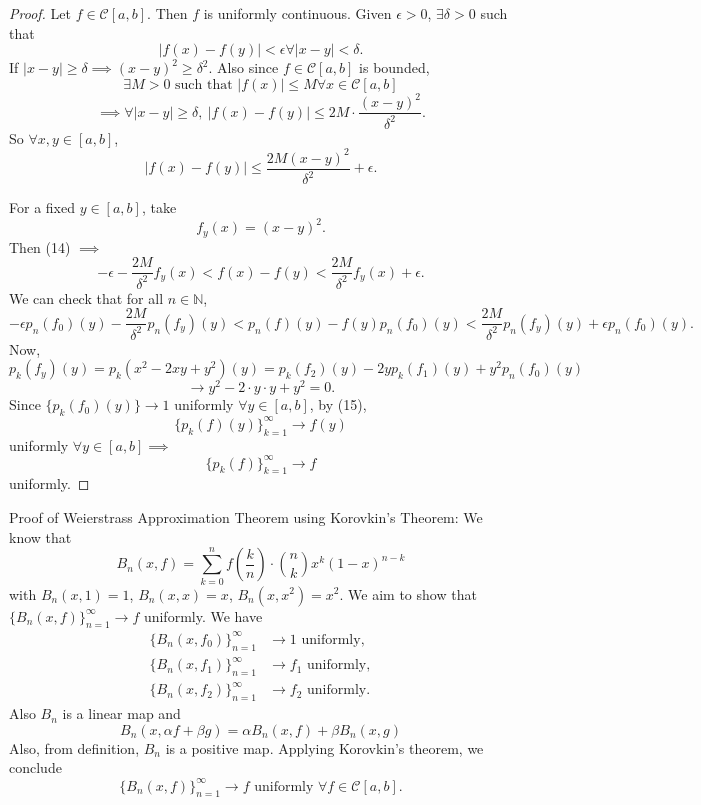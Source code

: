 \documentclass{functionspaces}
\begin{document}
\begin{proof}
Let \( f \in \mathcal{C}[a,b] \). Then \( f \) is uniformly continuous. Given \( \epsilon>0 \), \( \exists  \delta>0 \) such that
\[
|f(x)-f(y)|<\epsilon  \forall  |x-y|<\delta.
\]
If \( |x-y| \geq \delta  \implies  (x-y)^{2} \geq \delta^{2} \). Also since \( f \in \mathcal{C}[a,b] \) is bounded,
\[
\exists  M>0 \text{ such that } |f(x)| \leq M  \forall  x \in \mathcal{C}[a,b]
\]
\[
\implies  \forall  |x-y| \geq \delta,\ |f(x)-f(y)| \leq 2M \cdot \frac{(x-y)^{2}}{\delta^{2}}.
\]
So \( \forall  x,y \in [a,b] \),
\[
|f(x)-f(y)| \leq \frac{2M(x-y)^{2}}{\delta^{2}}+\epsilon. \tag{14}
\]

For a fixed \( y \in [a,b] \), take
\[
f_{y}(x)=(x-y)^{2}.
\]
Then (14) \( \implies \)
\[
-\epsilon-\frac{2M}{\delta^{2}}f_{y}(x)<f(x)-f(y)<\frac{2M}{\delta^{2}}f_{y}(x)+\epsilon.
\]
We can check that for all \( n \in \mathbb{N} \),
\[
-\epsilon p_{n}(f_{0})(y)-\frac{2M}{\delta^{2}}p_{n}(f_{y})(y)<p_{n}(f)(y)-f(y)p_{n}(f_{0})(y)<\frac{2M}{\delta^{2}}p_{n}(f_{y})(y)+\epsilon p_{n}(f_{0})(y). \tag{15}
\]
Now,
\[
p_{k}(f_{y})(y)=p_{k}(x^{2}-2xy+y^{2})(y)=p_{k}(f_{2})(y)-2yp_{k}(f_{1})(y)+y^{2}p_{n}(f_{0})(y)
\]
\[
\to y^{2}-2 \cdot y \cdot y + y^{2}=0.
\]
Since \( \{p_{k}(f_{0})(y)\} \to 1 \) uniformly \( \forall  y \in [a,b] \), by (15),
\[
\{p_{k}(f)(y)\}_{k=1}^{\infty} \to f(y)
\]
uniformly \( \forall  y \in [a,b]  \implies \)
\[
\{p_{k}(f)\}_{k=1}^{\infty} \to f
\]
uniformly.
\end{proof}

Proof of Weierstrass Approximation Theorem using Korovkin's Theorem:
We know that
\[
B_{n}(x,f)=\sum_{k=0}^{n}f\left(\frac{k}{n}\right) \cdot \binom{n}{k}x^{k}(1-x)^{n-k}
\]
with \( B_{n}(x,1)=1 \), \( B_{n}(x,x)=x \), \( B_{n}(x,x^{2})=x^{2} \). We aim to show that \( \{B_{n}(x,f)\}_{n=1}^{\infty} \to f \) uniformly. We have
\begin{align*}
\{B_{n}(x,f_{0})\}_{n=1}^{\infty} &\to 1 \text{ uniformly}, \\
\{B_{n}(x,f_{1})\}_{n=1}^{\infty} &\to f_{1} \text{ uniformly}, \\
\{B_{n}(x,f_{2})\}_{n=1}^{\infty} &\to f_{2} \text{ uniformly}.
\end{align*}
Also \( B_{n} \) is a linear map and
\[
B_{n}(x,\alpha f+\beta g)=\alpha B_{n}(x,f)+\beta B_{n}(x,g)
\]
Also, from definition, \( B_{n} \) is a positive map. Applying Korovkin's theorem, we conclude
\[
\{B_{n}(x,f)\}_{n=1}^{\infty} \to f \text{ uniformly } \forall  f \in \mathcal{C}[a,b].
\]
\end{document}
